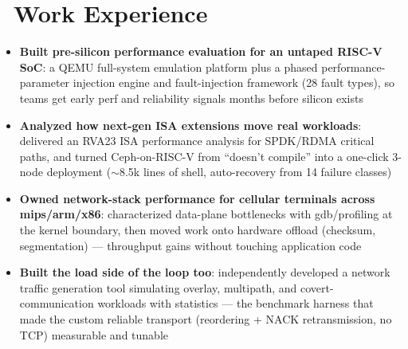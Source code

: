 \documentclass{resume}
\begin{document}
\section{\faBriefcase\ Work Experience}
\begin{onehalfspacing}
\begin{itemize}
	\item \textbf{Built pre-silicon performance evaluation for an untaped RISC-V SoC}: a QEMU full-system emulation platform plus a phased performance-parameter injection engine and fault-injection framework (28 fault types), so teams get early perf and reliability signals months before silicon exists
	\item \textbf{Analyzed how next-gen ISA extensions move real workloads}: delivered an RVA23 ISA performance analysis for SPDK/RDMA critical paths, and turned Ceph-on-RISC-V from ``doesn't compile'' into a one-click 3-node deployment ($\sim$8.5k lines of shell, auto-recovery from 14 failure classes)
\end{itemize}
\end{onehalfspacing}

\begin{onehalfspacing}
\begin{itemize}
	\item \textbf{Owned network-stack performance for cellular terminals across mips/arm/x86}: characterized data-plane bottlenecks with gdb/profiling at the kernel boundary, then moved work onto hardware offload (checksum, segmentation) --- throughput gains without touching application code
\end{itemize}
\end{onehalfspacing}

\begin{onehalfspacing}
\begin{itemize}
	\item \textbf{Built the load side of the loop too}: independently developed a network traffic generation tool simulating overlay, multipath, and covert-communication workloads with statistics --- the benchmark harness that made the custom reliable transport (reordering + NACK retransmission, no TCP) measurable and tunable
\end{itemize}
\end{onehalfspacing}
\end{document}
